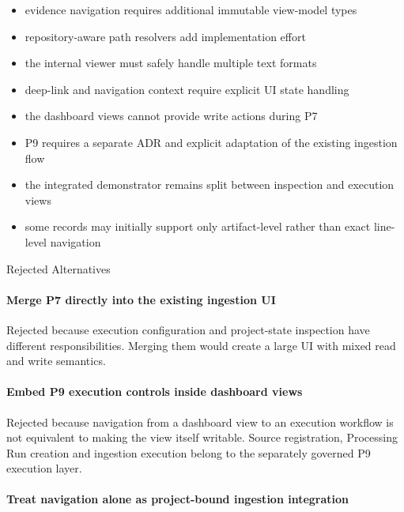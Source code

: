 \begin{itemize}
\tightlist
\item
  evidence navigation requires additional immutable view-model types
\item
  repository-aware path resolvers add implementation effort
\item
  the internal viewer must safely handle multiple text formats
\item
  deep-link and navigation context require explicit UI state handling
\item
  the dashboard views cannot provide write actions during P7
\item
  P9 requires a separate ADR and explicit adaptation of the existing ingestion flow
\item
  the integrated demonstrator remains split between inspection and execution views
\item
  some records may initially support only artifact-level rather than exact line-level navigation
\end{itemize}

Rejected Alternatives

\hypertarget{merge-p7-directly-into-the-existing-ingestion-ui}{%
\paragraph{Merge P7 directly into the existing ingestion UI}\label{merge-p7-directly-into-the-existing-ingestion-ui}}

Rejected because execution configuration and project-state inspection have different responsibilities. Merging them would create a large UI with mixed read and write semantics.

\hypertarget{embed-p9-execution-controls-inside-dashboard-views}{%
\paragraph{Embed P9 execution controls inside dashboard views}\label{embed-p9-execution-controls-inside-dashboard-views}}

Rejected because navigation from a dashboard view to an execution workflow is not equivalent to making the view itself writable. Source registration, Processing Run creation and ingestion execution belong to the separately governed P9 execution layer.

\hypertarget{treat-navigation-alone-as-project-bound-ingestion-integration}{%
\paragraph{Treat navigation alone as project-bound ingestion integration}\label{treat-navigation-alone-as-project-bound-ingestion-integration}}

